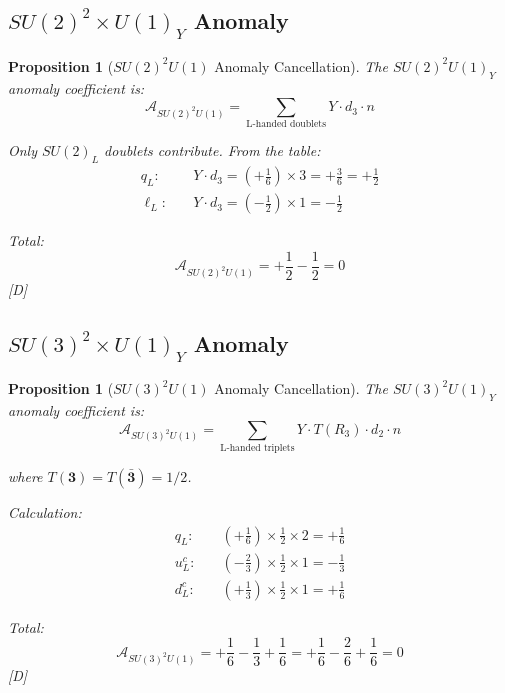 \documentclass[11pt,a4paper]{article}
\newtheorem{proposition}[theorem]{Proposition}
\newcommand{\tagD}{\textcolor{blue!70!black}{[D]}}
\begin{document}
\subsection{$SU(2)^2 \times U(1)_Y$ Anomaly}

\begin{proposition}[$SU(2)^2 U(1)$ Anomaly Cancellation]
\label{prop:su2-anomaly}
The $SU(2)^2 U(1)_Y$ anomaly coefficient is:
\begin{equation}
\label{eq:su2-anomaly-def}
\mathcal{A}_{SU(2)^2 U(1)} = \sum_{\text{L-handed doublets}} Y \cdot d_3 \cdot n
\end{equation}

Only $SU(2)_L$ doublets contribute. From the table:
\begin{align}
\label{eq:su2-qL}
q_L: \quad & Y \cdot d_3 = (+\frac{1}{6}) \times 3 = +\frac{3}{6} = +\frac{1}{2} \\
\label{eq:su2-lL}
\ell_L: \quad & Y \cdot d_3 = (-\frac{1}{2}) \times 1 = -\frac{1}{2}
\end{align}

Total:
\begin{equation}
\label{eq:su2-total}
\boxed{\mathcal{A}_{SU(2)^2 U(1)} = +\frac{1}{2} - \frac{1}{2} = 0}
\end{equation}
\tagD
\end{proposition}

\subsection{$SU(3)^2 \times U(1)_Y$ Anomaly}

\begin{proposition}[$SU(3)^2 U(1)$ Anomaly Cancellation]
\label{prop:su3-2-u1-anomaly}
The $SU(3)^2 U(1)_Y$ anomaly coefficient is:
\begin{equation}
\label{eq:su3-2-u1-def}
\mathcal{A}_{SU(3)^2 U(1)} = \sum_{\text{L-handed triplets}} Y \cdot T(R_3) \cdot d_2 \cdot n
\end{equation}

where $T(\mathbf{3}) = T(\bar{\mathbf{3}}) = 1/2$.

Calculation:
\begin{align}
\label{eq:su3-2-u1-qL}
q_L: \quad & (+\frac{1}{6}) \times \frac{1}{2} \times 2 = +\frac{1}{6} \\
\label{eq:su3-2-u1-uLc}
u_L^c: \quad & (-\frac{2}{3}) \times \frac{1}{2} \times 1 = -\frac{1}{3} \\
\label{eq:su3-2-u1-dLc}
d_L^c: \quad & (+\frac{1}{3}) \times \frac{1}{2} \times 1 = +\frac{1}{6}
\end{align}

Total:
\begin{equation}
\label{eq:su3-2-u1-total}
\boxed{\mathcal{A}_{SU(3)^2 U(1)} = +\frac{1}{6} - \frac{1}{3} + \frac{1}{6} = +\frac{1}{6} - \frac{2}{6} + \frac{1}{6} = 0}
\end{equation}
\tagD
\end{proposition}
\end{document}
